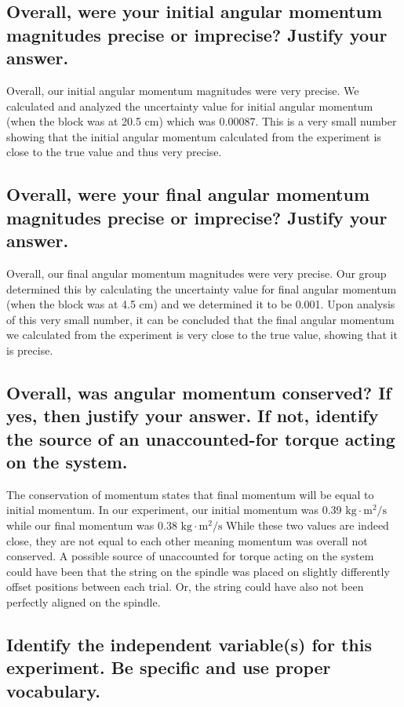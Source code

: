 \documentclass[12pt]{article}
\begin{document}
\subsection{Overall, were your initial angular momentum magnitudes precise or imprecise? Justify your answer.}

Overall, our initial angular momentum magnitudes were very precise. We calculated and analyzed the uncertainty value for initial angular momentum (when the block was at 20.5 cm) which was 0.00087. This is a very small number showing that the initial angular momentum calculated from the experiment is close to the true value and thus very precise.

\subsection{Overall, were your final angular momentum magnitudes precise or imprecise? Justify your answer.}

Overall, our final angular momentum magnitudes were very precise. Our group determined this by calculating the uncertainty value for final angular momentum (when the block was at 4.5 cm) and we determined it to be 0.001. Upon analysis of this very small number, it can be concluded that the final angular momentum we calculated from the experiment is very close to the true value, showing that it is precise.

\subsection{Overall, was angular momentum conserved? If yes, then justify your answer. If not, identify the source of an unaccounted-for torque acting on the system.}

The conservation of momentum states that final momentum will be equal to initial momentum. In our experiment, our initial momentum was 0.39 $\text{kg} \cdot \text{m}^2 / \text{s}$ while our final momentum was 0.38 $\text{kg} \cdot \text{m}^2 / \text{s}$ 
While these two values are indeed close, they are not equal to each other meaning momentum was overall not conserved.
A possible source of unaccounted for torque acting on the system could have been that the string on the spindle was placed on slightly differently offset positions between each trial. Or, the string could have also not been perfectly aligned on the spindle. 

\subsection{Identify the independent variable(s) for this experiment.
Be specific and use proper vocabulary.}
\end{document}

